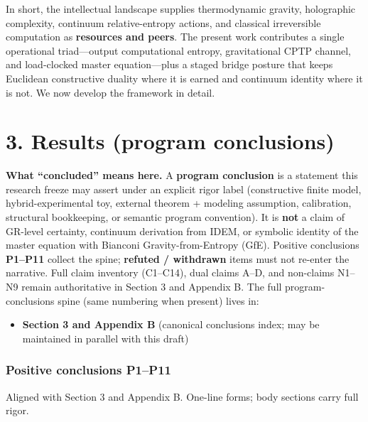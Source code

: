 \documentclass[
  11pt,
]{article}
\providecommand{\tightlist}{%
  \setlength{\itemsep}{0pt}\setlength{\parskip}{0pt}}
\begin{document}
In short, the intellectual landscape supplies thermodynamic gravity, holographic complexity, continuum relative-entropy actions, and classical irreversible computation as \textbf{resources and peers}. The present work contributes a single operational triad---output computational entropy, gravitational CPTP channel, and load-clocked master equation---plus a staged bridge posture that keeps Euclidean constructive duality where it is earned and continuum identity where it is not. We now develop the framework in detail.

\section{3. Results (program conclusions)}\label{results-program-conclusions}

\textbf{What ``concluded'' means here.} A \textbf{program conclusion} is a statement this research freeze may assert under an explicit rigor label (constructive finite model, hybrid-experimental toy, external theorem + modeling assumption, calibration, structural bookkeeping, or semantic program convention). It is \textbf{not} a claim of GR-level certainty, continuum derivation from IDEM, or symbolic identity of the master equation with Bianconi Gravity-from-Entropy (GfE). Positive conclusions \textbf{P1--P11} collect the spine; \textbf{refuted / withdrawn} items must not re-enter the narrative. Full claim inventory (C1--C14), dual claims A--D, and non-claims N1--N9 remain authoritative in Section 3 and Appendix B. The full program-conclusions spine (same numbering when present) lives in:

\begin{itemize}
\tightlist
\item
  \textbf{Section 3 and Appendix B} (canonical conclusions index; may be maintained in parallel with this draft)
\end{itemize}

\subsubsection{Positive conclusions P1--P11}\label{positive-conclusions-p1p11}

Aligned with Section 3 and Appendix B. One-line forms; body sections carry full rigor.
\end{document}

